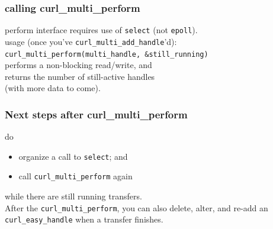 \begin{frame}
  \frametitle{calling curl\_multi\_perform}

  
    perform interface requires use of {\tt select} (not {\tt epoll}).\\[1em]

    usage (once you've {\tt curl\_multi\_add\_handle}'d):\\[.5em]
{\tt curl\_multi\_perform(multi\_handle, \&still\_running)}\\[.5em]
    performs a non-blocking read/write, and\\
    returns the number of still-active handles\\ \hspace*{2em} (with more data to come).

  

\end{frame}

\begin{frame}
  \frametitle{Next steps after curl\_multi\_perform}

  
    do
    \begin{itemize}
      \item organize a call to {\tt select}; and
      \item call {\tt curl\_multi\_perform} again
    \end{itemize}
    while there are still running transfers.\\[1em]

    After the {\tt curl\_multi\_perform}, you can also delete, alter,
    and re-add an {\tt curl\_easy\_handle} when a transfer finishes.
  

\end{frame}


